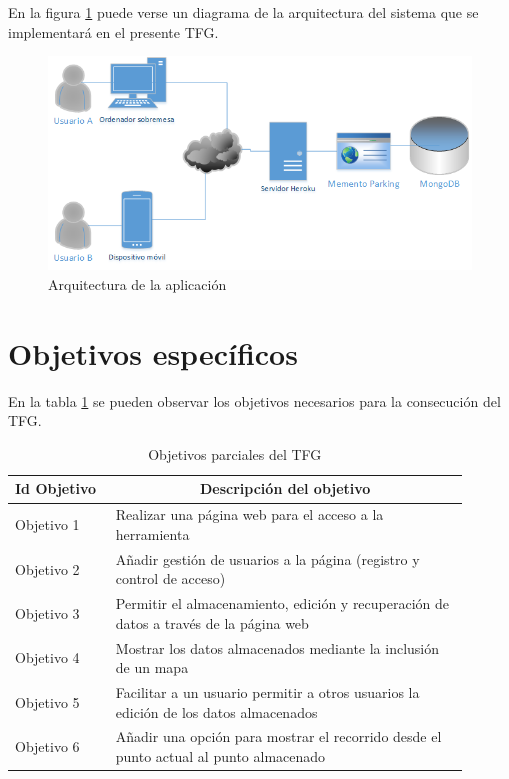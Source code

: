 
En la figura \ref{fig:arquitectura} puede verse un diagrama de la arquitectura del sistema que se implementará en el presente \ac{TFG}.
\begin{figure}[h!btp]
\centering
\includegraphics[scale=0.75, fbox={\fboxrule} 4mm]{images/02-objetivos/02-arquitectura.png}
\caption{Arquitectura de la aplicación}
\label{fig:arquitectura}
\end{figure}


\section{Objetivos específicos}

En la tabla \ref{tab:objetivos} se pueden observar los objetivos necesarios para la consecución del \ac{TFG}.

\begin{table}[hp]
  \centering 
  \begin{tabular}{p{0.2\linewidth}p{0.7\linewidth}}
    \multicolumn{1}{l}{\cellcolor{black!30}\textbf{Id Objetivo}} & 
 	\multicolumn{1}{c}{\cellcolor{black!30}\textbf{Descripción del objetivo}}\\
    \toprule
    Objetivo 1 & Realizar una página web para el acceso a la herramienta \\
	Objetivo 2 & Añadir gestión de usuarios a la página (registro y control de acceso) \\
	Objetivo 3 & Permitir el almacenamiento, edición y recuperación de datos a través de la página web \\
	Objetivo 4 & Mostrar los datos almacenados mediante la inclusión de un mapa \\
	Objetivo 5 & Facilitar a un usuario permitir a otros usuarios la edición de los datos almacenados \\
	Objetivo 6 & Añadir una opción para mostrar el recorrido desde el punto actual al punto almacenado \\
    \hline
  \end{tabular}
  \caption{Objetivos parciales del \ac{TFG}}
  \label{tab:objetivos}
\end{table}

